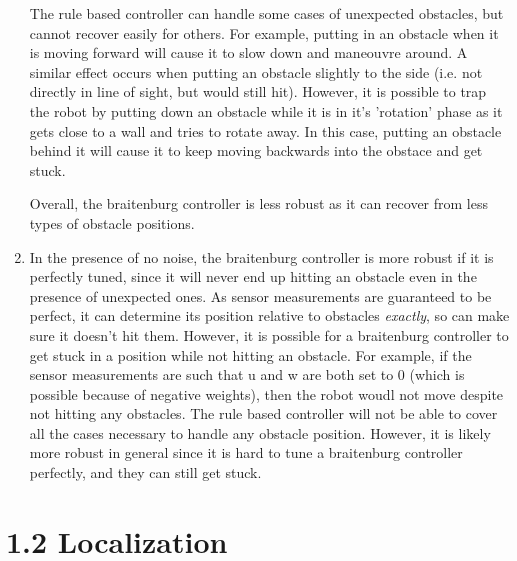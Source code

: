 \documentclass[12pt,a4paper]{article}
\begin{document}
\begin{enumerate}[label=(\alph*)]
		The rule based controller can handle some cases of unexpected obstacles, but cannot recover easily for others. For example, putting in an obstacle when it is moving forward will cause it to slow down and maneouvre around. A similar effect occurs when putting an obstacle slightly to the side (i.e. not directly in line of sight, but would still hit). However, it is possible to trap the robot by putting down an obstacle while it is in it's 'rotation' phase as it gets close to a wall and tries to rotate away. In this case, putting an obstacle behind it will cause it to keep moving backwards into the obstace and get stuck.

		Overall, the braitenburg controller is less robust as it can recover from less types of obstacle positions.

        \item In the presence of no noise, the braitenburg controller is more robust if it is perfectly tuned, since it will never end up hitting an obstacle even in the presence of unexpected ones. As sensor measurements are guaranteed to be perfect, it can determine its position relative to obstacles \textit{exactly}, so can make sure it doesn't hit them. However, it is possible for a braitenburg controller to get stuck in a position while not hitting an obstacle. For example, if the sensor measurements are such that u and w are both set to 0 (which is possible because of negative weights), then the robot woudl not move despite not hitting any obstacles. The rule based controller will not be able to cover all the cases necessary to handle any obstacle position. However, it is likely more robust in general since it is hard to tune a braitenburg controller perfectly, and they can still get stuck.

	\end{enumerate}
\section*{1.2 Localization}
\end{document}
